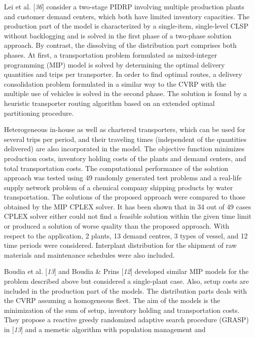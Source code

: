 \twocolumn 
\par Lei et al. [\textit{36}] consider a two-stage PIDRP
 involving multiple production plants and customer demand centers, which both have
 limited inventory capacities. The production part of the model is characterized by a
 single-item, single-level CLSP without backlogging and is solved in the first phase
 of a two-phase solution approach. By contrast, the dissolving of the distribution
 part comprises both phases. At first, a transportation problem formulated as
 mixed-integer programming (MIP) model is solved by determining the optimal delivery
 quantities and trips per transporter. In order to find optimal routes, a delivery
 consolidation problem formulated in a similar way to the CVRP with the multiple use
 of vehicles is solved in the second phase. The solution is found by a heuristic
 transporter routing algorithm based on an extended optimal partitioning
 procedure.\par Heterogeneous in-house as well as chartered transporters, which can be used for
 several trips per period, and their traveling times (independent of the quantities
 delivered) are also incorporated in the model. The objective function minimizes
 production costs, inventory holding costs of the plants and demand centers, and total
 transportation costs. The computational performance of the solution approach was
 tested using 49 randomly generated test problems and a real-life supply network
 problem of a chemical company shipping products by water transportation. The
 solutions of the proposed approach were compared to those obtained by the MIP CPLEX
 solver. It has been shown that in 34 out of 49 cases CPLEX solver either could not
 find a feasible solution within the given time limit or produced a solution of worse
 quality than the proposed approach. With respect to the application, 2 plants, 13
 demand centres, 3 types of vessel, and 12 time periods were considered. Interplant
 distribution for the shipment of raw materials and maintenance schedules were also
 included.\par Boudia et al. [\textit{13}] and Boudia \& Prins
 [\textit{12}] developed similar MIP models for the
 problem described above but considered a single-plant case. Also, setup costs are
 included in the production part of the models. The distribution parts deals with the
 CVRP assuming a homogeneous fleet. The aim of the models is the minimization of the
 sum of setup, inventory holding and transportation costs. They propose a reactive
 greedy randomized adaptive search procedure (GRASP) in [\textit{13}] and a memetic algorithm with population management and
